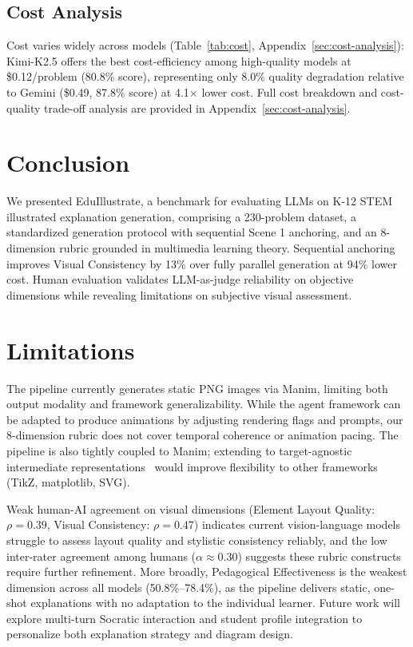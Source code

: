 \documentclass[11pt]{article}
\begin{document}
\subsection{Cost Analysis}

Cost varies widely across models (Table~\ref{tab:cost}, Appendix~\ref{sec:cost-analysis}): Kimi-K2.5 offers the best cost-efficiency among high-quality models at \$0.12/problem (80.8\% score), representing only 8.0\% quality degradation relative to Gemini (\$0.49, 87.8\% score) at 4.1$\times$ lower cost. Full cost breakdown and cost-quality trade-off analysis are provided in Appendix~\ref{sec:cost-analysis}.

\section{Conclusion}

We presented EduIllustrate, a benchmark for evaluating LLMs on K-12 STEM illustrated explanation generation, comprising a 230-problem dataset, a standardized generation protocol with sequential Scene 1 anchoring, and an 8-dimension rubric grounded in multimedia learning theory. Sequential anchoring improves Visual Consistency by 13\% over fully parallel generation at 94\% lower cost. Human evaluation validates LLM-as-judge reliability on objective dimensions while revealing limitations on subjective visual assessment.

\section*{Limitations}

The pipeline currently generates static PNG images via Manim, limiting both output modality and framework generalizability. While the agent framework can be adapted to produce animations by adjusting rendering flags and prompts, our 8-dimension rubric does not cover temporal coherence or animation pacing. The pipeline is also tightly coupled to Manim; extending to target-agnostic intermediate representations~\citep{kumar2025diagramir} would improve flexibility to other frameworks (TikZ, matplotlib, SVG).

Weak human-AI agreement on visual dimensions (Element Layout Quality: $\rho = 0.39$, Visual Consistency: $\rho = 0.47$) indicates current vision-language models struggle to assess layout quality and stylistic consistency reliably, and the low inter-rater agreement among humans ($\alpha \approx 0.30$) suggests these rubric constructs require further refinement. More broadly, Pedagogical Effectiveness is the weakest dimension across all models (50.8\%--78.4\%), as the pipeline delivers static, one-shot explanations with no adaptation to the individual learner. Future work will explore multi-turn Socratic interaction and student profile integration to personalize both explanation strategy and diagram design.
\end{document}
